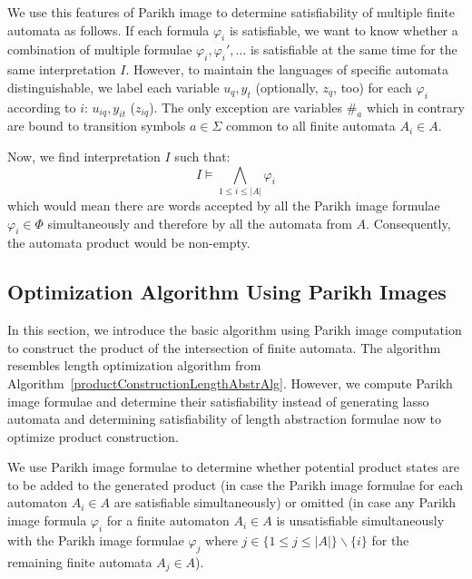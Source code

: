 We use this features of Parikh image to determine satisfiability of multiple finite automata as follows. If each formula $\varphi_i$ is satisfiable, we want to know whether a combination of multiple formulae $\varphi_i, \varphi_i', \ldots$ is satisfiable at the same time for the same interpretation $I$. However, to maintain the languages of specific automata distinguishable, we label each variable $u_q, y_t$ (optionally, $z_q$, too) for each $\varphi_i$ according to $i$: $u_{iq}, y_{it}$ ($z_{iq}$). The only exception are variables $\#_a$ which in contrary are bound to transition symbols $a \in \Sigma$ common to all finite automata $A_i \in A$.

Now, we find interpretation $I$ such that:
$$ I \models \bigwedge_{1 \leq i \leq |A|} \varphi_i$$
\noindent which would mean there are words accepted by all the Parikh image formulae $\varphi_i \in \Phi$ simultaneously and therefore by all the automata from $A$. Consequently, the automata product would be non-empty.

\subsection{Optimization Algorithm Using Parikh Images}

In this section, we introduce the basic algorithm using Parikh image computation to construct the product of the intersection of finite automata. The algorithm resembles length optimization algorithm from Algorithm~\ref{productConstructionLengthAbstrAlg}. However, we compute Parikh image formulae and determine their satisfiability instead of generating lasso automata and determining satisfiability of length abstraction formulae now to optimize product construction.

We use Parikh image formulae to determine whether potential product states are to be added to the generated product (in case the Parikh image formulae for each automaton $A_i \in A$ are satisfiable simultaneously) or omitted (in case any Parikh image formula $\varphi_i$ for a finite automaton $A_i \in A$ is unsatisfiable simultaneously with the Parikh image formulae $\varphi_j$ where $j \in \{ 1 \leq j \leq |A| \} \backslash \{i\}$ for the remaining finite automata $A_j \in A$).

